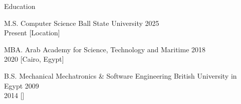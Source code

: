 \begin{rSection}{Education}
    \begin{rESubsection}
        {M.S. Computer Science}
        {Ball State University}
        {2025 \\ Present}
        [Location] %
    \end{rESubsection}

    \begin{rESubsection}
        {MBA.}
        {Arab Academy for Science, Technology and Maritime}
        {2018 \\ 2020}
        [Cairo, Egypt] %
    \end{rESubsection}

    \begin{rESubsection}
        {B.S. Mechanical Mechatronics & Software Engineering}
        {British University in Egypt}
        {2009 \\ 2014}
        [] %
    \end{rESubsection}
\end{rSection}